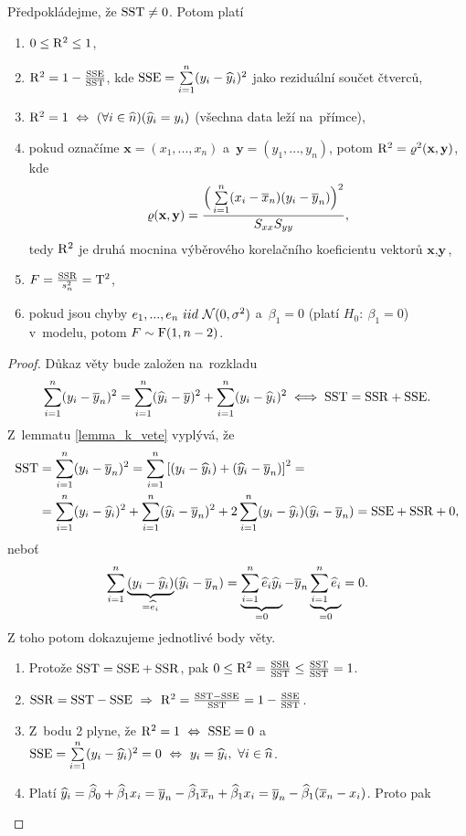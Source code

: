 \begin{theorem}\label{vetasbysxx}
	Předpokládejme, že $\mathrm{SST}\neq 0$. Potom platí\begin{enumerate}
		\item $0\leq \mathrm{R}^2\leq1$,
		\item $\mathrm{R}^2 = 1-\frac{\mathrm{SSE}}{\mathrm{SST}}$, kde $\mathrm{SSE} = \sum\limits_{i=1}^{n} (y_i-\widehat{y}_i)^2$ jako reziduální součet čtverců,
		\item $\mathrm{R}^2 = 1~\Leftrightarrow~(\forall i\in\widehat{n})(\widehat{y}_i = y_i)$ (všechna data leží na~přímce),
		\item pokud označíme $\textbf{x} = (x_1,...,x_n)$ a~$\textbf{y} = (y_1,...,y_n)$, potom $\mathrm{R}^2 = \varrho^2(\textbf{x},\textbf{y})$, kde $$ \varrho(\textbf{x},\textbf{y}) = \frac{ \Big( \sum\limits_{i=1}^{n} (x_i-\overline{x}_n)(y_i-\overline{y}_n) \Big)^2}{S_{xx} S_{yy}}, $$ tedy $\mathrm{R}^2$ je druhá mocnina výběrového korelačního koeficientu vektorů $\textbf{x},\textbf{y}$,
		\item $F = \frac{\mathrm{SSR}}{s_n^2} = \mathrm{T}^2$,
		\item pokud jsou chyby $e_1,...,e_n~iid~\mathcal{N}(0,\sigma^2)$ a~$\beta_1 = 0$ (platí $H_0:~\beta_1 = 0$) v~modelu, potom $F\sim\mathrm{F}(1,n-2)$.
	\end{enumerate}
\begin{proof}
	Důkaz věty bude založen na~rozkladu
	 $$ \sum\limits_{i=1}^{n} (y_i-\overline{y}_n)^2  = \sum\limits_{i=1}^{n} (\widehat{y}_i-\overline{y})^2 + \sum\limits_{i=1}^{n} (y_i-\widehat{y}_i)^2 \iff \mathrm{SST} = \mathrm{SSR}+\mathrm{SSE}.$$
	 Z~lemmatu \ref{lemma_k_vete} vyplývá, že
	\[
	\begin{split}
	\mathrm{SST}& = \sum\limits_{i=1}^{n} (y_i-\overline{y}_n)^2 = \sum\limits_{i=1}^{n} \left[(y_i-\widehat{y}_i)+(\widehat{y}_i-\overline{y}_n) \right]^2 = \\& = \sum\limits_{i=1}^{n} (y_i-\widehat{y}_i)^2+\sum\limits_{i=1}^{n} (\widehat{y}_i-\overline{y}_n)^2+2\sum\limits_{i=1}^{n} (y_i-\widehat{y}_i)(\widehat{y}_i-\overline{y}_n) = \mathrm{SSE}+\mathrm{SSR}+0,
	\end{split}
	\]
	neboť $$ \sum\limits_{i=1}^{n} \underbrace{(y_i-\widehat{y}_i)}_{ = \widehat{e}_i}(\widehat{y}_i-\overline{y}_n) = \underbrace{\sum\limits_{i=1}^{n} \widehat{e}_i\widehat{y}_i}_{ = 0}-\overline{y}_n\underbrace{\sum\limits_{i=1}^{n} \widehat{e}_i}_{ = 0} = 0. $$
	Z toho potom dokazujeme jednotlivé body věty. \begin{enumerate}
		\item Protože $\mathrm{SST} = \mathrm{SSE}+\mathrm{SSR}$, pak $0\leq \mathrm{R}^2 = \frac{\mathrm{SSR}}{\mathrm{SST}}\leq \frac{\mathrm{SST}}{\mathrm{SST}} = 1$.
		\item $\mathrm{SSR} = \mathrm{SST}-\mathrm{SSE}~\Rightarrow~\mathrm{R}^2 = \frac{\mathrm{SST}-\mathrm{SSE}}{\mathrm{SST}} = 1-\frac{\mathrm{SSE}}{\mathrm{SST}}$.
		\item Z~bodu 2 plyne, že $\mathrm{R}^2 = 1~\Leftrightarrow~\mathrm{SSE} = 0$ a~$\mathrm{SSE} = \sum\limits_{i=1}^{n} (y_i-\widehat{y}_i)^2 = 0~\Leftrightarrow~y_i = \widehat{y}_i, ~\forall i\in\widehat{n}$.
		\item Platí $\widehat{y}_i = \widehat{\beta}_0 + \widehat{\beta}_1 x_i = \overline{y}_n-\widehat{\beta}_1 \overline{x}_n + \widehat{\beta}_1 x_i = \overline{y}_n-\widehat{\beta}_1(\overline{x}_n-x_i)$. Proto pak

\end{enumerate}
\end{proof}
\end{theorem}
